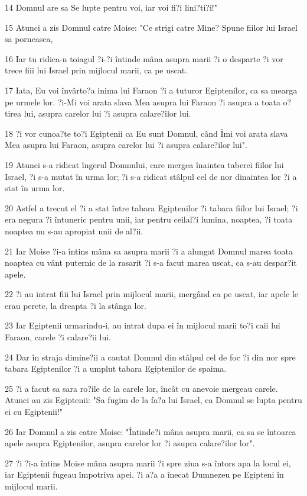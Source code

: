 \par 14 Domnul are sa Se lupte pentru voi, iar voi fi?i lini?ti?i!"
\par 15 Atunci a zis Domnul catre Moise: "Ce strigi catre Mine? Spune fiilor lui Israel sa porneasca,
\par 16 Iar tu ridica-n toiagul ?i-?i întinde mâna asupra marii ?i o desparte ?i vor trece fiii lui Israel prin mijlocul marii, ca pe uscat.
\par 17 Iata, Eu voi învârto?a inima lui Faraon ?i a tuturor Egiptenilor, ca sa mearga pe urmele lor. ?i-Mi voi arata slava Mea asupra lui Faraon ?i asupra a toata o?tirea lui, asupra carelor lui ?i asupra calare?ilor lui.
\par 18 ?i vor cunoa?te to?i Egiptenii ca Eu sunt Domnul, când Îmi voi arata slava Mea asupra lui Faraon, asupra carelor lui ?i asupra calare?ilor lui".
\par 19 Atunci s-a ridicat îngerul Domnului, care mergea înaintea taberei fiilor lui Israel, ?i s-a mutat în urma lor; ?i s-a ridicat stâlpul cel de nor dinaintea lor ?i a stat în urma lor.
\par 20 Astfel a trecut el ?i a stat între tabara Egiptenilor ?i tabara fiilor lui Israel; ?i era negura ?i întuneric pentru unii, iar pentru ceilal?i lumina, noaptea, ?i toata noaptea nu s-au apropiat unii de al?ii.
\par 21 Iar Moise ?i-a întins mâna sa asupra marii ?i a alungat Domnul marea toata noaptea cu vânt puternic de la rasarit ?i s-a facut marea uscat, ca s-au despar?it apele.
\par 22 ?i au intrat fiii lui Israel prin mijlocul marii, mergând ca pe uscat, iar apele le erau perete, la dreapta ?i la stânga lor.
\par 23 Iar Egiptenii urmarindu-i, au intrat dupa ei în mijlocul marii to?i caii lui Faraon, carele ?i calare?ii lui.
\par 24 Dar în straja dimine?ii a cautat Domnul din stâlpul cel de foc ?i din nor spre tabara Egiptenilor ?i a umplut tabara Egiptenilor de spaima.
\par 25 ?i a facut sa sara ro?ile de la carele lor, încât cu anevoie mergeau carele. Atunci au zis Egiptenii: "Sa fugim de la fa?a lui Israel, ca Domnul se lupta pentru ei cu Egiptenii!"
\par 26 Iar Domnul a zis catre Moise: "Întinde?i mâna asupra marii, ca sa se întoarca apele asupra Egiptenilor, asupra carelor lor ?i asupra calare?ilor lor".
\par 27 ?i ?i-a întins Moise mâna asupra marii ?i spre ziua s-a întors apa la locul ei, iar Egiptenii fugeau împotriva apei. ?i a?a a înecat Dumnezeu pe Egipteni în mijlocul marii.
